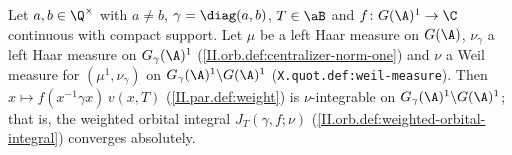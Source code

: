 Let $a,b\in\Q^\times$ with $a\neq b$, $\gamma=\diag(a,b)$, $T\in\aB$ and $f\colon G(\A)^1\to\C$ continuous with compact support. Let $\mu$ be a left Haar
measure on $G(\A)$, $\nu_\gamma$ a left Haar measure on $G_\gamma(\A)^1$ (\cref{II.orb.def:centralizer-norm-one}) and $\nu$ a Weil measure for
$(\mu^1,\nu_\gamma)$ on $G_\gamma(\A)^1\backslash G(\A)^1$ (\texttt{X.quot.def:weil-measure}). Then $x\mapsto f(x^{-1}\gamma x)\,v(x,T)$
(\cref{II.par.def:weight}) is $\nu$-integrable on $G_\gamma(\A)^1\backslash G(\A)^1$; that is, the weighted orbital integral $J_T(\gamma,f;\nu)$
(\cref{II.orb.def:weighted-orbital-integral}) converges absolutely.
